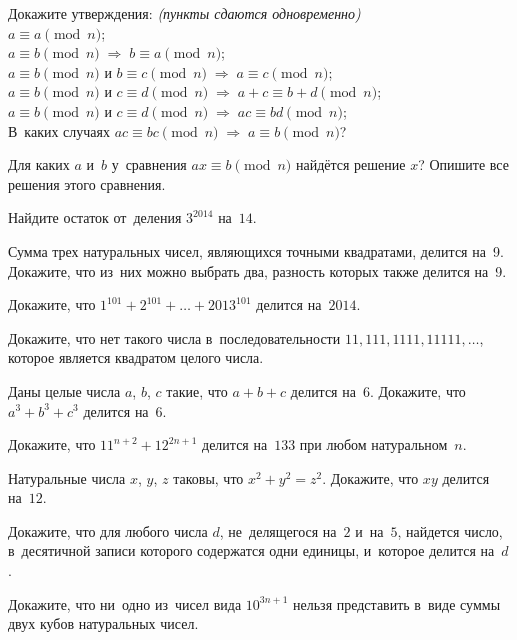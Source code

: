 \begin{problems}

\item
Докажите утверждения: \emph{(пункты сдаются одновременно)}
\\
\sp $a \equiv a \pmod n$; %
\\
\sp
\(
    a \equiv b \pmod n
\;\Rightarrow\;
    b \equiv a \pmod n
\);
\\
\sp
\(
    a \equiv b \pmod n \text{ и } b \equiv c \pmod n
\;\Rightarrow\;
    a \equiv c \pmod n
\);
\\
\sp
\(
    a \equiv b \pmod n \text{ и } c \equiv d \pmod n
\;\Rightarrow\;
    a + c \equiv b + d \pmod n
\);
\\
\sp
\(
    a \equiv b \pmod n \text{ и } c \equiv d \pmod n
\;\Rightarrow\;
    a c \equiv b d \pmod n
\);
\\
\sp%
В~каких случаях
\(
    a c \equiv b c \pmod n
\;\Rightarrow\;
    a\equiv b \pmod n
\)?

\item
Для каких $a$ и~$b$ у~сравнения $ax \equiv b \pmod n$ найдётся решение $x$?
Опишите все решения этого сравнения.

\item
Найдите остаток от~деления $3^{2014}$ на~$14$.

\item
Сумма трех натуральных чисел, являющихся точными квадратами, делится на~9.
Докажите, что из~них можно выбрать два, разность которых также делится на~9.

\item
Докажите, что $1^{101} + 2^{101} + \dots + 2013^{101}$ делится на~$2014$.

\item
Докажите, что нет такого числа в~последовательности
$11, 111, 1111, 11111, \ldots$,
которое является квадратом целого числа. 

\item
Даны целые числа $a$, $b$, $c$ такие, что $a + b + c$ делится на~$6$.
Докажите, что $a^3 + b^3 + c^3$ делится на~$6$.

\item
Докажите, что $11^{n+2} + 12^{2n + 1}$ делится на~$133$ при любом
натуральном~$n$.

\item
Натуральные числа $x$, $y$, $z$ таковы, что $x^2 + y^2 = z^2$.
Докажите, что $xy$ делится на~$12$.

\item
Докажите, что для любого числа $d$, не~делящегося на~$2$ и~на~$5$, найдется
число, в~десятичной записи которого содержатся одни единицы, и~которое
делится на~$d$.

\item
Докажите, что ни~одно из~чисел вида $10^{3n+1}$ нельзя представить в~виде суммы
двух кубов натуральных чисел.

\end{problems}

